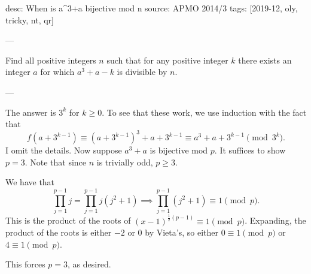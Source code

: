 desc: When is a^3+a bijective mod n
source: APMO 2014/3
tags: [2019-12, oly, tricky, nt, qr]

---

Find all positive integers $n$ such that for any positive integer $k$ there exists an integer $a$ for which $a^3+a-k$ is divisible by $n$.

---

The answer is $3^k$ for $k\ge0$. To see that these work, we use induction with the fact that \[f\left(a+3^{k-1}\right)\equiv\left(a+3^{k-1}\right)^3+a+3^{k-1}\equiv a^3+a+3^{k-1}\pmod{3^k}.\]
I omit the details. Now suppose $a^3+a$ is bijective mod $p$. It suffices to show $p=3$. Note that since $n$ is trivially odd, $p\ge3$.

We have that \[\prod_{j=1}^{p-1}j=\prod_{j=1}^{p-1}j(j^2+1)\implies\prod_{j=1}^{p-1}(j^2+1)\equiv1\pmod p.\]
This is the product of the roots of $(x-1)^{\frac12(p-1)}\equiv1\pmod p$. Expanding, the product of the roots is either $-2$ or $0$ by Vieta's, so either $0\equiv1\pmod p$ or $4\equiv1\pmod p$.

This forces $p=3$, as desired.
